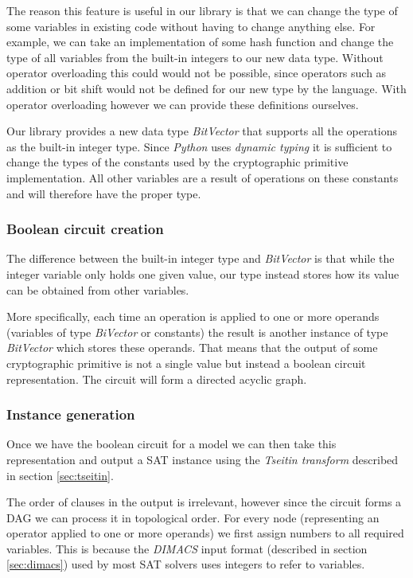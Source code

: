 
The reason this feature is useful in our library is that we can change the type of some variables in existing code without having to change anything else.
For example, we can take an implementation of some hash function and change the type of all variables from the built-in integers to our new data type.
Without operator overloading this could would not be possible, since operators such as addition or bit shift would not be defined for our new type by the language.
With operator overloading however we can provide these definitions ourselves.

Our library provides a new data type \emph{BitVector} that supports all the operations as the built-in integer type.
Since \emph{Python} uses \emph{dynamic typing} it is sufficient to change the types of the constants used by the cryptographic primitive implementation.
All other variables are a result of operations on these constants and will therefore have the proper type.

\subsubsection{Boolean circuit creation}
The difference between the built-in integer type and \emph{BitVector} is that while the integer variable only holds one given value, our type instead stores how its value can be obtained from other variables.

More specifically, each time an operation is applied to one or more operands (variables of type \emph{BiVector} or constants) the result is another instance of type \emph{BitVector} which stores these operands.  That means that the output of some cryptographic primitive is not a single value but instead a boolean circuit representation. The circuit will form a directed acyclic graph.

\subsubsection{Instance generation}
Once we have the boolean circuit for a model we can then take this representation and output a SAT instance using the \emph{Tseitin transform} described in section \ref{sec:tseitin}.

The order of clauses in the output is irrelevant, however since the circuit forms a DAG we can process it in topological order.
For every node (representing an operator applied to one or more operands) we first assign numbers to all required variables.
This is because the \emph{DIMACS} input format (described in section \ref{sec:dimacs}) used by most SAT solvers uses integers to refer to variables.

